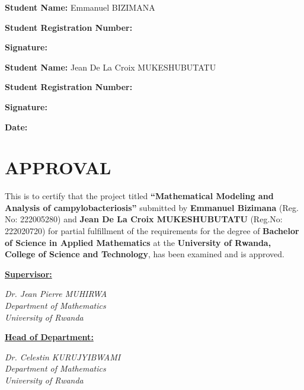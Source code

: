 \documentclass[a4paper,12pt]{report}
\begin{document}
\vspace{2em}

\noindent
\textbf{Student Name:} Emmanuel BIZIMANA

\vspace{1em}

\noindent
\textbf{Student Registration Number:} \dotfill

\vspace{1em}

\noindent
\textbf{Signature:} \dotfill

\vspace{1em}
\noindent
\textbf{Student Name:} Jean De La Croix MUKESHUBUTATU

\vspace{1em}

\noindent
\textbf{Student Registration Number:} \dotfill

\vspace{1em}

\noindent
\textbf{Signature:} \dotfill

\textbf{Date:} \dotfill

\newpage

    \chapter*{  APPROVAL}


\vspace{2em}

This is to certify that the project titled \textbf{“Mathematical Modeling and Analysis of campylobacteriosis”} submitted by \textbf{Emmanuel Bizimana} (Reg. No: 222005280) and \textbf{Jean De La Croix MUKESHUBUTATU} (Reg.No: 222020720) for partial fulfillment of the requirements for the degree of \textbf{Bachelor of Science in Applied Mathematics} at the \textbf{University of Rwanda, College of Science and Technology}, has been examined and is approved.

\vspace{3em}

\noindent
\begin{minipage}[t]{0.48\textwidth}
    \underline{\textbf{Supervisor:}} \\

\vspace{0.2em}
    
    \textit{Dr. Jean Pierre MUHIRWA }\\
    \textit{Department of Mathematics} \\
    \textit{University of Rwanda}
\end{minipage}
\hfill
\begin{minipage}[t]{0.48\textwidth}
    \underline{\textbf{Head of Department:}} \\

\vspace{0.2em}

    \textit{Dr. Celestin KURUJYIBWAMI} \\
    \textit{Department of Mathematics} \\
    \textit{University of Rwanda}
\end{minipage}
\end{document}
